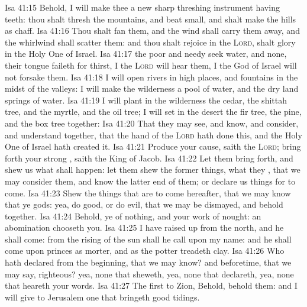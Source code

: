 \vs Isa 41:15 Behold, I will make thee a new sharp threshing instrument having teeth: thou shalt thresh the mountains, and beat  small, and shalt make the hills as chaff.
\vs Isa 41:16 Thou shalt fan them, and the wind shall carry them away, and the whirlwind shall scatter them: and thou shalt rejoice in the \textsc{Lord},  shalt glory in the Holy One of Israel.
\vs Isa 41:17  the poor and needy seek water, and  none,  their tongue faileth for thirst, I the \textsc{Lord} will hear them, I the God of Israel will not forsake them.
\vs Isa 41:18 I will open rivers in high places, and fountains in the midst of the valleys: I will make the wilderness a pool of water, and the dry land springs of water.
\vs Isa 41:19 I will plant in the wilderness the cedar, the shittah tree, and the myrtle, and the oil tree; I will set in the desert the fir tree,  the pine, and the box tree together:
\vs Isa 41:20 That they may see, and know, and consider, and understand together, that the hand of the \textsc{Lord} hath done this, and the Holy One of Israel hath created it.
\vs Isa 41:21 Produce your cause, saith the \textsc{Lord}; bring forth your strong , saith the King of Jacob.
\vs Isa 41:22 Let them bring  forth, and shew us what shall happen: let them shew the former things, what they , that we may consider them, and know the latter end of them; or declare us things for to come.
\vs Isa 41:23 Shew the things that are to come hereafter, that we may know that ye  gods: yea, do good, or do evil, that we may be dismayed, and behold  together.
\vs Isa 41:24 Behold, ye  of nothing, and your work of nought: an abomination  chooseth you.
\vs Isa 41:25 I have raised up  from the north, and he shall come: from the rising of the sun shall he call upon my name: and he shall come upon princes as  morter, and as the potter treadeth clay.
\vs Isa 41:26 Who hath declared from the beginning, that we may know? and beforetime, that we may say,  righteous? yea,  none that sheweth, yea,  none that declareth, yea,  none that heareth your words.
\vs Isa 41:27 The first  to Zion, Behold, behold them: and I will give to Jerusalem one that bringeth good tidings.
